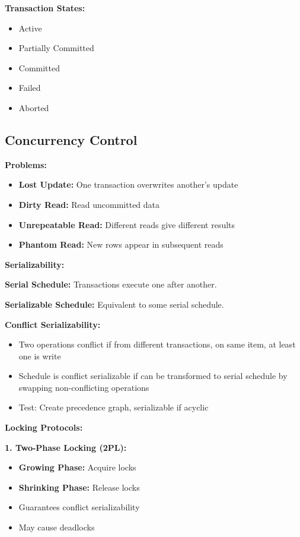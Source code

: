 \documentclass[11pt,a4paper]{article}
\begin{document}
\textbf{Transaction States:}
\begin{itemize}
    \item Active
    \item Partially Committed
    \item Committed
    \item Failed
    \item Aborted
\end{itemize}

\subsection{Concurrency Control}

\textbf{Problems:}
\begin{itemize}
    \item \textbf{Lost Update:} One transaction overwrites another's update
    \item \textbf{Dirty Read:} Read uncommitted data
    \item \textbf{Unrepeatable Read:} Different reads give different results
    \item \textbf{Phantom Read:} New rows appear in subsequent reads
\end{itemize}

\textbf{Serializability:}
\begin{defbox}
\textbf{Serial Schedule:} Transactions execute one after another.
\end{defbox}

\begin{defbox}
\textbf{Serializable Schedule:} Equivalent to some serial schedule.
\end{defbox}

\textbf{Conflict Serializability:}
\begin{itemize}
    \item Two operations conflict if from different transactions, on same item, at least one is write
    \item Schedule is conflict serializable if can be transformed to serial schedule by swapping non-conflicting operations
    \item Test: Create precedence graph, serializable if acyclic
\end{itemize}

\textbf{Locking Protocols:}

\textbf{1. Two-Phase Locking (2PL):}
\begin{itemize}
    \item \textbf{Growing Phase:} Acquire locks
    \item \textbf{Shrinking Phase:} Release locks
    \item Guarantees conflict serializability
    \item May cause deadlocks
\end{itemize}
\end{document}
